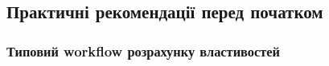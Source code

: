 %
%


\subsection*{Практичні рекомендації перед початком}

\subsubsection*{Типовий workflow розрахунку властивостей}

